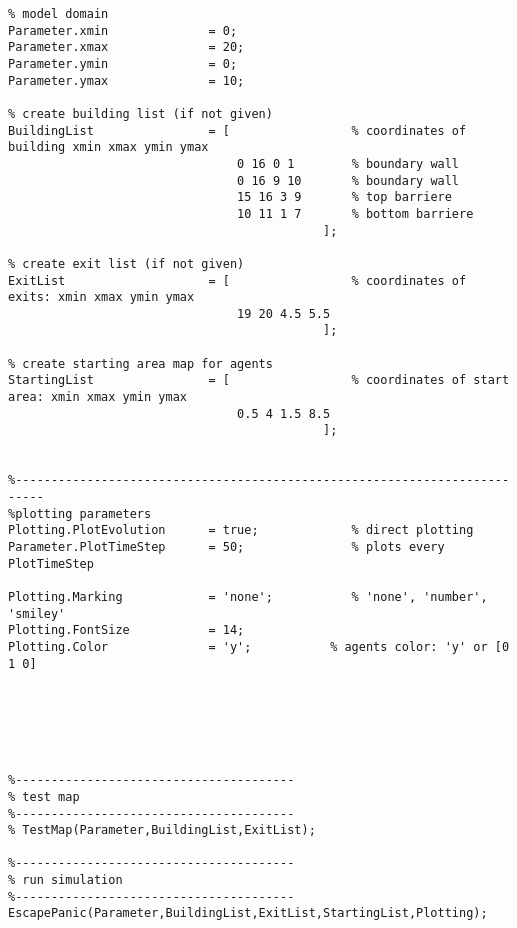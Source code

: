 \begin{lstlisting}[breaklines]
%--------------------------------------------------------------------------
% model domain
Parameter.xmin              = 0;
Parameter.xmax              = 20;
Parameter.ymin              = 0;
Parameter.ymax              = 10;

% create building list (if not given)
BuildingList                = [                 % coordinates of building xmin xmax ymin ymax
                                0 16 0 1        % boundary wall
                                0 16 9 10       % boundary wall
                                15 16 3 9       % top barriere
                                10 11 1 7       % bottom barriere
                                            ];
        
% create exit list (if not given)
ExitList                    = [                 % coordinates of exits: xmin xmax ymin ymax
                                19 20 4.5 5.5
                                            ];
       
% create starting area map for agents
StartingList                = [             	% coordinates of start area: xmin xmax ymin ymax
                                0.5 4 1.5 8.5
                                            ];
       
                                        
%--------------------------------------------------------------------------
%plotting parameters
Plotting.PlotEvolution      = true;             % direct plotting
Parameter.PlotTimeStep      = 50;               % plots every PlotTimeStep

Plotting.Marking            = 'none';           % 'none', 'number', 'smiley'
Plotting.FontSize           = 14;
Plotting.Color              = 'y';           % agents color: 'y' or [0 1 0]






%---------------------------------------
% test map
%---------------------------------------
% TestMap(Parameter,BuildingList,ExitList);      
       
%---------------------------------------
% run simulation
%---------------------------------------
EscapePanic(Parameter,BuildingList,ExitList,StartingList,Plotting);

\end{lstlisting}




